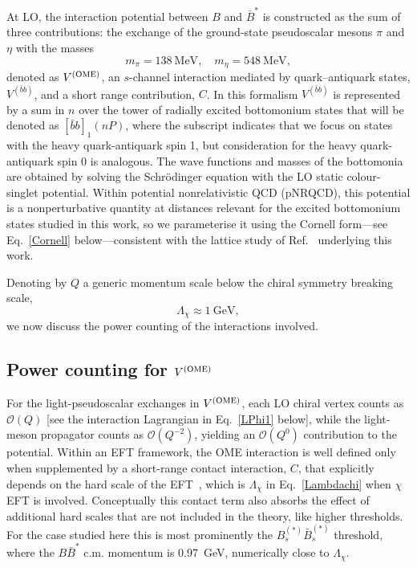 \documentclass[aps,prd,showpacs,amsmath,twocolumn,superscriptaddress,floatfix,nofootinbib,notitlepage]{revtex4-2}
\newcommand{\bbnP}{[\bar{b}b]_1(nP)}
\newcommand{\be}{\begin{equation}}
\newcommand{\ee}{\end{equation}}
\newcommand{\VQQ}{V^{(\bar{b}b)}}
\newcommand{\VOME}{V^{\rm (OME)}}
\begin{document}
At LO, the interaction potential between $B$ and $\bar{B}^*$ is constructed as the sum of three contributions: the exchange of the ground-state pseudoscalar mesons $\pi$ and $\eta$ with the masses \cite{ParticleDataGroup:2026mpi}
\be
m_\pi=138~\mbox{MeV},\quad m_\eta=548~\mbox{MeV},
\label{mphi}
\ee
denoted as $\VOME$, an $s$-channel interaction mediated by quark--antiquark states, $\VQQ$, and a short range contribution, $C$. In this formalism $\VQQ$ is represented by a sum in $n$ over the tower of radially excited bottomonium states
that will be denoted as $\bbnP$, where the subscript indicates that we focus on states with the heavy quark-antiquark spin 1, but consideration for the heavy quark-antiquark spin 0 is analogous. 
The wave functions and masses of the bottomonia are obtained by solving the Schr{\"o}dinger equation with the LO static colour-singlet potential. Within potential nonrelativistic QCD (pNRQCD), this potential is a nonperturbative quantity at distances relevant for the excited bottomonium states studied in this work, so we parameterise it using the Cornell form---see Eq.~\eqref{Cornell} below---consistent with the lattice study of Ref.~\cite{Bulava:2024jpj} underlying this work.

Denoting by $Q$ a generic momentum scale below the chiral symmetry breaking scale, 
\be
\Lambda_\chi \approx 1~\mbox{GeV},
\label{Lambdachi}
\ee
 we now discuss the power counting of the interactions involved.

\subsection{Power counting for $\VOME$}
\label{sec:OMEcounting}

For the light-pseudoscalar exchanges in $\VOME$, each LO chiral vertex counts as $\mathcal{O}(Q)$ [see the interaction Lagrangian in Eq.~\eqref{LPhi1} below], while the light-meson propagator counts as $\mathcal{O}(Q^{-2})$, yielding an $\mathcal{O}(Q^0)$ contribution to the potential. Within an EFT framework, the OME interaction is well defined only when supplemented by a short-range contact interaction, $C$, that explicitly depends on the hard scale of the EFT~\cite{Baru:2015nea}, which is $\Lambda_\chi$ in Eq.~\eqref{Lambdachi} when ${\chi}$EFT is involved. 
Conceptually this contact term also absorbs the effect of additional hard scales that are not included in the theory, like higher thresholds. For the case studied here this is most prominently the $B_s^{(*)}\bar{B}^{(*)}_s$ threshold, where the $B\bar{B}^*$ c.m. momentum is 0.97~GeV, numerically close to $\Lambda_\chi$. 
\end{document}
